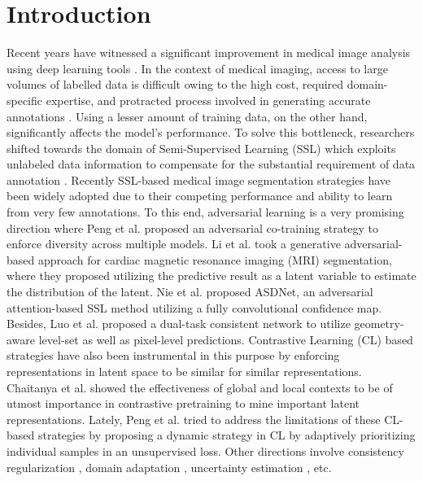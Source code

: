\documentclass[runningheads]{llncs}
\begin{document}
\section{Introduction}
\label{sec:Introduction}
Recent years have witnessed a significant improvement in medical image analysis using deep learning tools \cite{basak2020comparative,basak2021dfenet,basak2020f,basak2021cervical}. In the context of medical imaging, access to large volumes of labelled data is difficult owing to the high cost, required domain-specific expertise, and protracted process involved in generating accurate annotations \cite{basak2022mfsnet,basak2022exceedingly}. Using a lesser amount of training data, on the other hand, significantly affects the model's performance. To solve this bottleneck, researchers shifted towards the domain of Semi-Supervised Learning (SSL) which exploits unlabeled data information to compensate for the substantial requirement of data annotation \cite{chen2019self}. Recently SSL-based medical image segmentation strategies have been widely adopted due to their competing performance and ability to learn from very few annotations. To this end, adversarial learning is a very promising direction where Peng et al. \cite{peng2020deep} proposed an adversarial co-training strategy to enforce diversity across multiple models. Li et al. \cite{li2021semi} took a generative adversarial-based approach for cardiac magnetic resonance imaging (MRI) segmentation, where they proposed utilizing the predictive result as a latent variable to estimate the distribution of the latent. Nie et al. \cite{nie2018asdnet} proposed ASDNet, an adversarial attention-based SSL method utilizing a fully convolutional confidence map. Besides, Luo et al. \cite{luo2021semi} proposed a dual-task consistent network to utilize geometry-aware level-set as well as pixel-level predictions.   
Contrastive Learning (CL) based strategies \cite{chaitanya2020contrastive,zeng2021positional} have also been instrumental in this purpose by enforcing representations in latent space to be similar for similar representations. Chaitanya et al. \cite{chaitanya2020contrastive} showed the effectiveness of global and local contexts to be of utmost importance in contrastive pretraining to mine important latent representations. Lately, Peng et al. \cite{peng2021self} tried to address the limitations of these CL-based strategies by proposing a dynamic strategy in CL by adaptively prioritizing individual samples in an unsupervised loss. Other directions involve consistency regularization \cite{xie2021intra}, domain adaptation \cite{xia2020uncertainty}, uncertainty estimation \cite{wang2021tripled}, etc. 
\end{document}
